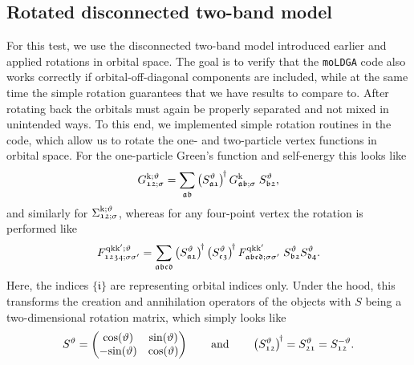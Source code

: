 \documentclass[../../main.tex]{subfiles}
\begin{document}
\newpage
\subsection{Rotated disconnected two-band model}\label{sec:validation_iii}

For this test, we use the disconnected two-band model introduced earlier and applied rotations in orbital space. The goal is to verify that the \texttt{moLDGA} code also works correctly if orbital-off-diagonal components are included, while at the same time the simple rotation guarantees that we have results to compare to. After rotating back the orbitals must again be properly separated and not mixed in unintended ways. To this end, we implemented simple rotation routines in the code, which allow us to rotate the one- and two-particle vertex functions in orbital space. For the one-particle Green's function and self-energy this looks like
\begin{align}
	G_{\mathfrak{12};\sigma}^{\text{k};\vartheta}=\sum_{\mathfrak{ab}}\left (S^{\vartheta}_{\mathfrak{a1}}\right )^{\!\dagger} G_{\mathfrak{ab;\sigma}}^{\text{k}}\; S_{\mathfrak{b2}}^{\vartheta},
\end{align}
and similarly for $\Sigma_{\mathfrak{12};\sigma}^{\text{k};\vartheta}$, whereas for any four-point vertex the rotation is performed like
\begin{align}
	F_{\mathfrak{1234};\sigma\sigma'}^{\text{q}\text{k}\text{k}';\vartheta}=\sum_{\mathfrak{abcd}}\left( S^{\vartheta}_{\mathfrak{a1}}\right)^{\!\dagger} \left (S^{\vartheta}_{\mathfrak{c3}}\right)^{\!\dagger} F_{\mathfrak{abcd};\sigma\sigma'}^{\text{q}\text{k}\text{k}'}\; S_{\mathfrak{b2}}^{\vartheta}S_{\mathfrak{d4}}^{\vartheta}.
\end{align}
Here, the indices $\{\mathfrak{i}\}$ are representing orbital indices only. Under the hood, this transforms the creation and annihilation operators of the objects with $S$ being a two-dimensional rotation matrix, which simply looks like
\begin{align}
	S^{\vartheta} = \begin{pmatrix}
	\text{cos}(\vartheta) & \text{sin}(\vartheta)\\-\text{sin}(\vartheta)&\text{cos}(\vartheta)
	\end{pmatrix}\qquad\text{and}\qquad \left (S^{\vartheta}_{\mathfrak{12}}\right )^{\!\dagger}=S_{\mathfrak{21}}^{\vartheta}=S_{\mathfrak{12}}^{-\vartheta}.
\end{align}
\end{document}
